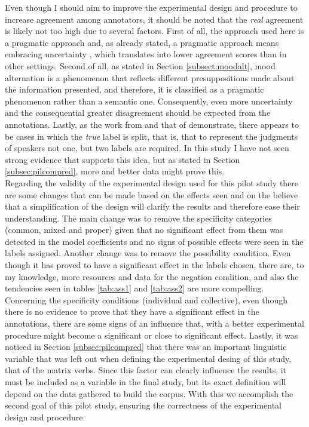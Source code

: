 Even though I should aim to improve the experimental design and procedure to increase agreement among annotators, it should be noted that the \textit{real} agreement is likely not too high due to several factors. First of all, the approach used here is a pragmatic approach and, as already stated, a pragmatic approach means embracing uncertainty \citep{de2012did}, which translates into lower agreement scores than in other settings. Second of all, as stated in Section \ref{subsect:moodalt}, mood alternation is a phenomenon that reflects different presuppositions made about the information presented, and therefore, it is classified as a pragmatic phenomenon rather than a semantic one. Consequently, even more uncertainty and the consequential greater disagreement should be expected from the annotations. Lastly, as the work from \citet{de2012did} and that of \citet{pavlick2019inherent} demonstrate, there appears to be cases in which the \textit{true} label is split, that is, that to represent the judgments of speakers not one, but two labels are required. In this study I have not seen strong evidence that supports this idea, but as stated in Section \ref{subsec:pilcompred}, more and better data might prove this.\\

Regarding the validity of the experimental design used for this pilot study there are some changes that can be made based on the effects seen and on the believe that a simplification of the design will clarify the results and therefore ease their understanding. The main change was to remove the specificity categories (common, mixed and proper) given that no significant effect from them was detected in the model coefficients and no signs of possible effects were seen in the labels assigned. Another change was to remove the possibility condition. Even though it has proved to have a significant effect in the labels chosen, there are, to my knowledge, more resources and data for the negation condition, and also the tendencies seen in tables \ref{tab:ass1} and \ref{tab:ass2} are more compelling. Concerning the specificity conditions (individual and collective), even though there is no evidence to prove that they have a significant effect in the annotations, there are some signs of an influence that, with a better experimental procedure might become a significant or close to significant effect. Lastly, it was noticed in Section \ref{subsec:pilcompred} that there was an important linguistic variable that was left out when defining the experimental desing of this study, that of the matrix verbs. Since this factor can clearly influence the results, it must be included as a variable in the final study, but its exact definition will depend on the data gathered to build the corpus. With this we accomplish the second goal of this pilot study, ensuring the correctness of the experimental design and procedure.\\

